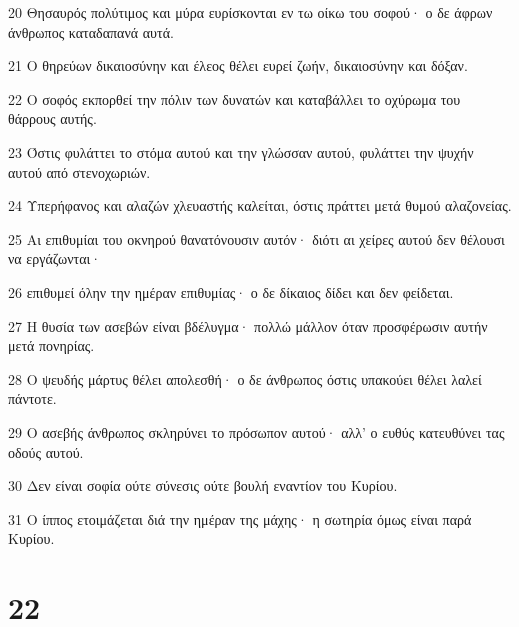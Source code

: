 \par 20 Θησαυρός πολύτιμος και μύρα ευρίσκονται εν τω οίκω του σοφού· ο δε άφρων άνθρωπος καταδαπανά αυτά.
\par 21 Ο θηρεύων δικαιοσύνην και έλεος θέλει ευρεί ζωήν, δικαιοσύνην και δόξαν.
\par 22 Ο σοφός εκπορθεί την πόλιν των δυνατών και καταβάλλει το οχύρωμα του θάρρους αυτής.
\par 23 Όστις φυλάττει το στόμα αυτού και την γλώσσαν αυτού, φυλάττει την ψυχήν αυτού από στενοχωριών.
\par 24 Υπερήφανος και αλαζών χλευαστής καλείται, όστις πράττει μετά θυμού αλαζονείας.
\par 25 Αι επιθυμίαι του οκνηρού θανατόνουσιν αυτόν· διότι αι χείρες αυτού δεν θέλουσι να εργάζωνται·
\par 26 επιθυμεί όλην την ημέραν επιθυμίας· ο δε δίκαιος δίδει και δεν φείδεται.
\par 27 Η θυσία των ασεβών είναι βδέλυγμα· πολλώ μάλλον όταν προσφέρωσιν αυτήν μετά πονηρίας.
\par 28 Ο ψευδής μάρτυς θέλει απολεσθή· ο δε άνθρωπος όστις υπακούει θέλει λαλεί πάντοτε.
\par 29 Ο ασεβής άνθρωπος σκληρύνει το πρόσωπον αυτού· αλλ' ο ευθύς κατευθύνει τας οδούς αυτού.
\par 30 Δεν είναι σοφία ούτε σύνεσις ούτε βουλή εναντίον του Κυρίου.
\par 31 Ο ίππος ετοιμάζεται διά την ημέραν της μάχης· η σωτηρία όμως είναι παρά Κυρίου.

\chapter{22}

